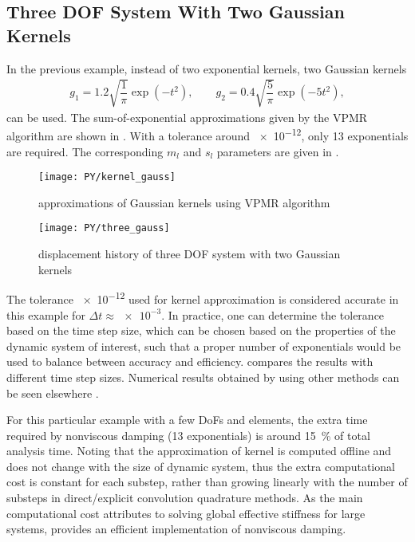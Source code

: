 \subsection{Three DOF System With Two Gaussian Kernels}
In the previous example, instead of two exponential kernels, two Gaussian kernels
\begin{gather}
g_1=1.2\sqrt{\dfrac{1}{\pi}}\exp\left(-t^2\right),\qquad
g_2=0.4\sqrt{\dfrac{5}{\pi}}\exp\left(-5t^2\right),
\end{gather}
can be used. The sum-of-exponential approximations given by the VPMR algorithm are shown in . With a tolerance around \num{e-12}, only \num{13} exponentials are required. The corresponding $m_l$ and $s_l$ parameters are given in .
\begin{figure}[H]
\centering
\texttt{[image: PY/kernel\_gauss]}
\caption{approximations of Gaussian kernels using VPMR algorithm}\label{fig:vpmr}
\end{figure}

\begin{figure}[H]
\centering
\texttt{[image: PY/three\_gauss]}
\caption{displacement history of three DOF system with two Gaussian kernels}\label{fig:three_gauss}
\end{figure}
The tolerance \num{e-12} used for kernel approximation is considered accurate in this example for $\Delta{}t\approx\num{e-3}$. In practice, one can determine the tolerance based on the time step size, which can be chosen based on the properties of the dynamic system of interest, such that a proper number of exponentials would be used to balance between accuracy and efficiency.  compares the results with different time step sizes. Numerical results obtained by using other methods can be seen elsewhere \citep{Shen2021}.

For this particular example with a few DoFs and elements, the extra time required by nonviscous damping (\num{13} exponentials) is around \SI{15}{\percent} of total analysis time. Noting that the approximation of kernel is computed offline and does not change with the size of dynamic system, thus the extra computational cost is constant for each substep, rather than growing linearly with the number of substeps in direct/explicit convolution quadrature methods. As the main computational cost attributes to solving global effective stiffness for large systems,  provides an efficient implementation of nonviscous damping.
